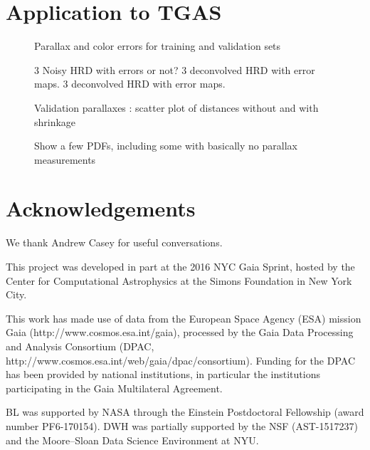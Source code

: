 \documentclass[aps,prd,showpacs,superscriptaddress,groupedaddress]{revtex4}  %
\begin{document}
\section{Application to TGAS}

\begin{figure}
\caption{Parallax and color errors for training and validation sets}
\end{figure}

\begin{figure}
\caption{3 Noisy HRD with errors or not? 3 deconvolved HRD with error maps. 3 deconvolved HRD with error maps. }
\end{figure}

\begin{figure}
\caption{Validation parallaxes : scatter plot of distances without and with shrinkage}
\end{figure}

\begin{figure}
\caption{Show a few PDFs, including some with basically no parallax measurements}
\end{figure}


\section{Acknowledgements}

We thank Andrew Casey for useful conversations.

This project was developed in part at the 2016 NYC Gaia Sprint, hosted by the Center for Computational Astrophysics at the Simons Foundation in New York City.

This work has made use of data from the European Space Agency (ESA) mission Gaia (http://www.cosmos.esa.int/gaia), processed by the Gaia Data Processing and Analysis Consortium (DPAC, http://www.cosmos.esa.int/web/gaia/dpac/consortium). Funding for the DPAC has been provided by national institutions, in particular the institutions participating in the Gaia Multilateral Agreement.

BL was supported by NASA through the Einstein Postdoctoral Fellowship (award number PF6-170154).
DWH was partially supported by the NSF (AST-1517237) and the Moore--Sloan Data Science Environment at NYU.




\appendix

\end{document}
